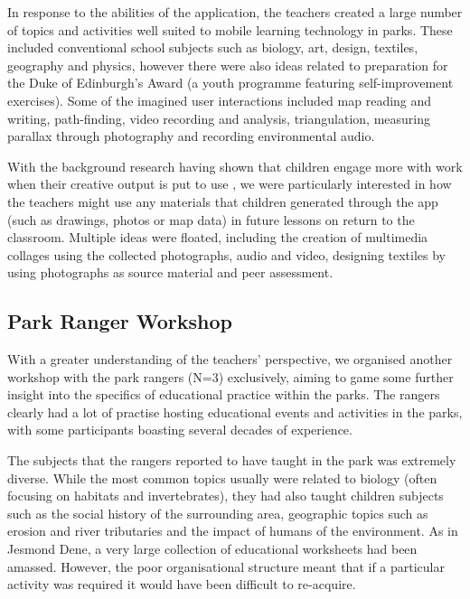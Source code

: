 In response to the abilities of the application, the teachers created a large number of topics and activities well suited to mobile learning technology in parks. These included conventional school subjects such as biology, art, design, textiles, geography and physics, however there were also ideas related to preparation for the Duke of Edinburgh’s Award (a youth programme featuring self-improvement exercises). Some of the imagined user interactions included map reading and writing, path-finding, video recording and analysis, triangulation, measuring parallax through photography and recording environmental audio.

With the background research having shown that children engage more with work when their creative output is put to use \citep{TheNationalEnvironmentalEducationFoundation}, we were particularly interested in how the teachers might use any materials that children generated through the app (such as drawings, photos or map data) in future lessons on return to the classroom. Multiple ideas were floated, including the creation of multimedia collages using the collected photographs, audio and video, designing textiles by using photographs as source material and peer assessment.

\subsection{Park Ranger Workshop}

With a greater understanding of the teachers’ perspective, we organised another workshop with the park rangers (N=3) exclusively, aiming to game some further insight into the specifics of educational practice within the parks. The rangers clearly had a lot of practise hosting educational events and activities in the parks, with some participants boasting several decades of experience.

The subjects that the rangers reported to have taught in the park was extremely diverse. While the most common topics usually were related to biology (often focusing on habitats and invertebrates), they had also taught children subjects such as the social history of the surrounding area, geographic topics such as erosion and river tributaries and the impact of humans of the environment. As in Jesmond Dene, a very large collection of educational worksheets had been amassed. However, the poor organisational structure meant that if a particular activity was required it would have been difficult to re-acquire.

